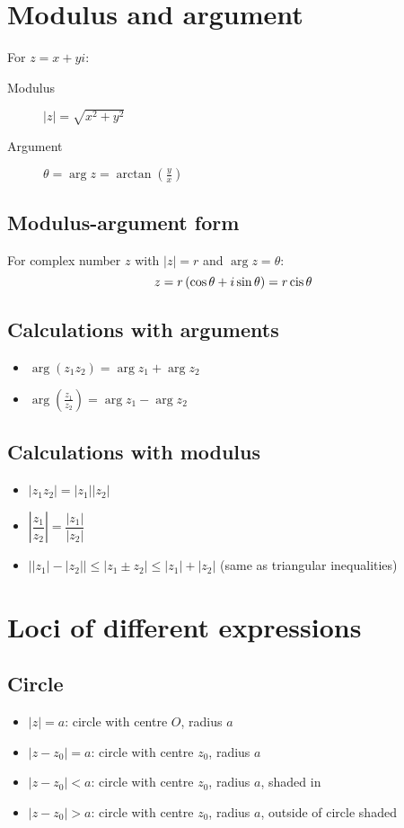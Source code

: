 \section{Modulus and argument}
For $z=x+yi$:
\begin{description}
    \item[Modulus] $|z| = \sqrt{x^2+y^2}$
    \item[Argument] $\theta = \arg z = \arctan\left(\frac{y}{x}\right)$
\end{description}

\subsection{Modulus-argument form}
For complex number $z$ with $|z|=r$ and $\arg z = \theta$:
$$z=r\left(\cos\theta + i\sin\theta\right)=r\operatorname{cis}\theta$$

\subsection{Calculations with arguments}
\begin{itemize}
    \item $\arg\left(z_1z_2\right)=\arg z_1 +\arg z_2$
	\item $\arg\left(\frac{z_1}{z_2}\right)=\arg z_1-\arg z_2$
\end{itemize}

\subsection{Calculations with modulus}
\begin{itemize}
	\item $|z_1z_2|=|z_1||z_2|$
	\item $\left|\dfrac{z_1}{z_2}\right|=\dfrac{|z_1|}{|z_2|}$
	\item $\left||z_1|-|z_2|\right| \leq |z_1 \pm z_2| \leq |z_1|+|z_2|$ (same as triangular inequalities)
\end{itemize}

\section{Loci of different expressions}
\subsection{Circle}
\begin{itemize}
	\item $|z| = a$: circle with centre $O$, radius $a$
	\item $|z-z_0|=a$: circle with centre $z_0$, radius $a$
	\item $|z-z_0|<a$: circle with centre $z_0$, radius $a$, shaded in
	\item $|z-z_0|>a$: circle with centre $z_0$, radius $a$, outside of circle shaded
\end{itemize}
